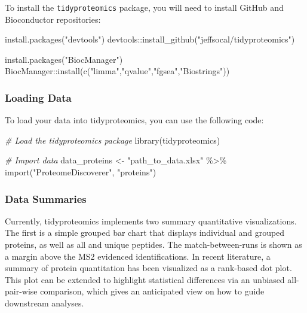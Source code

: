 \documentclass[
]{book}
\newenvironment{Shaded}{\begin{snugshade}}{\end{snugshade}}
\newcommand{\CommentTok}[1]{\textcolor[rgb]{0.56,0.35,0.01}{\textit{#1}}}
\newcommand{\FunctionTok}[1]{\textcolor[rgb]{0.00,0.00,0.00}{#1}}
\newcommand{\NormalTok}[1]{#1}
\newcommand{\OtherTok}[1]{\textcolor[rgb]{0.56,0.35,0.01}{#1}}
\newcommand{\SpecialCharTok}[1]{\textcolor[rgb]{0.00,0.00,0.00}{#1}}
\newcommand{\StringTok}[1]{\textcolor[rgb]{0.31,0.60,0.02}{#1}}
\begin{document}
To install the \texttt{tidyproteomics} package, you will need to install GitHub and Bioconductor repositories:

\begin{Shaded}
\begin{Highlighting}[]
\FunctionTok{install.packages}\NormalTok{(}\StringTok{"devtools"}\NormalTok{)}
\NormalTok{devtools}\SpecialCharTok{::}\FunctionTok{install\_github}\NormalTok{(}\StringTok{"jeffsocal/tidyproteomics"}\NormalTok{)}

\FunctionTok{install.packages}\NormalTok{(}\StringTok{"BiocManager"}\NormalTok{)}
\NormalTok{BiocManager}\SpecialCharTok{::}\FunctionTok{install}\NormalTok{(}\FunctionTok{c}\NormalTok{(}\StringTok{"limma"}\NormalTok{,}\StringTok{"qvalue"}\NormalTok{,}\StringTok{"fgsea"}\NormalTok{,}\StringTok{"Biostrings"}\NormalTok{))}
\end{Highlighting}
\end{Shaded}

\hypertarget{loading-data-1}{%
\subsubsection*{Loading Data}\label{loading-data-1}}

To load your data into tidyproteomics, you can use the following code:

\begin{Shaded}
\begin{Highlighting}[]
\CommentTok{\# Load the tidyproteomics package}
\FunctionTok{library}\NormalTok{(tidyproteomics)}

\CommentTok{\# Import data}
\NormalTok{data\_proteins }\OtherTok{\textless{}{-}} \StringTok{"path\_to\_data.xlsx"} \SpecialCharTok{\%\textgreater{}\%}
  \FunctionTok{import}\NormalTok{(}\StringTok{"ProteomeDiscoverer"}\NormalTok{, }\StringTok{"proteins"}\NormalTok{) }
\end{Highlighting}
\end{Shaded}

\hypertarget{data-summaries}{%
\subsubsection*{Data Summaries}\label{data-summaries}}

Currently, tidyproteomics implements two summary quantitative visualizations. The first is a simple grouped bar chart that displays individual and grouped proteins, as well as all and unique peptides. The match-between-runs is shown as a margin above the MS2 evidenced identifications. In recent literature, a summary of protein quantitation has been visualized as a rank-based dot plot. This plot can be extended to highlight statistical differences via an unbiased all-pair-wise comparison, which gives an anticipated view on how to guide downstream analyses.
\end{document}
